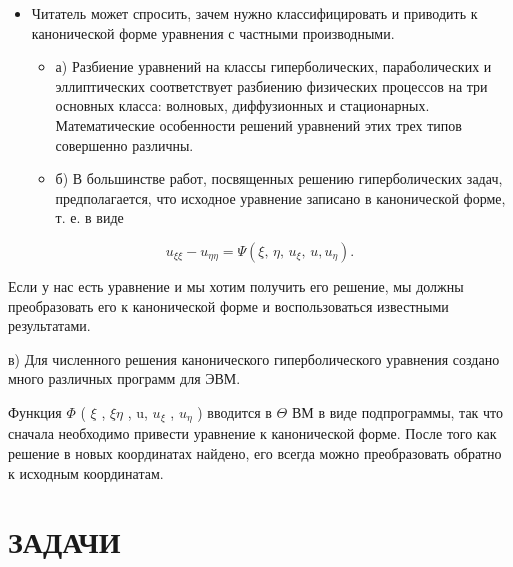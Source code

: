 \documentclass[
  ukrainian,
]{article}
\providecommand{\tightlist}{%
  \setlength{\itemsep}{0pt}\setlength{\parskip}{0pt}}
\begin{document}
\begin{itemize}
\tightlist
\item
  Читатель может спросить, зачем нужно классифицировать и приводить к
  канонической форме уравнения с частными производными.

  \begin{itemize}
  \tightlist
  \item
    а) Разбиение уравнений на классы гиперболических, параболических и
    эллиптических соответствует разбиению физических процессов на три
    основных класса: волновых, диффузионных и стационарных.
    Математические особенности решений уравнений этих трех типов
    совершенно различны.
  \item
    б) В большинстве работ, посвященных решению гиперболических задач,
    предполагается, что исходное уравнение записано в канонической
    форме, т. е. в виде
  \end{itemize}
\end{itemize}

\[
u_{\xi\xi} - u_{\eta\eta} = \Psi(\xi, \, \eta, \, u_{\xi}, \, u, u_{\eta}).
\]

Если у нас есть уравнение и мы хотим получить его решение, мы должны
преобразовать его к канонической форме и воспользоваться известными
результатами.

в) Для численного решения канонического гиперболического уравнения
создано много различных программ для ЭВМ.

Функция \(\Phi\) ( \(\xi\) , \(\xi \eta\) , u, \(u_{\xi}\) ,
\(u_{\eta}\) ) вводится в \(\Theta\) ВМ в виде подпрограммы, так что
сначала необходимо привести уравнение к канонической форме. После того
как решение в новых координатах найдено, его всегда можно преобразовать
обратно к исходным координатам.

\section{ЗАДАЧИ}\label{ux437ux430ux434ux430ux447ux438-9}
\end{document}
